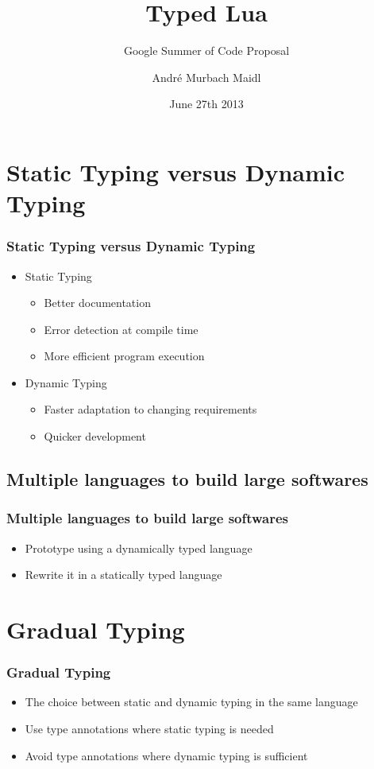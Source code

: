 \documentclass{beamer}
\begin{document}
\title{Typed Lua}
\subtitle{Google Summer of Code Proposal}
\author{André Murbach Maidl}
\date{June 27th 2013}

\frame{\titlepage}

\section{Static Typing versus Dynamic Typing}
\begin{frame}
\frametitle{Static Typing versus Dynamic Typing}
\begin{itemize}
\item Static Typing
\begin{itemize}
\item Better documentation
\item Error detection at compile time
\item More efficient program execution
\end{itemize}
\item Dynamic Typing
\begin{itemize}
\item Faster adaptation to changing requirements
\item Quicker development
\end{itemize}
\end{itemize}
\end{frame}

\subsection{Multiple languages to build large softwares}
\begin{frame}
\frametitle{Multiple languages to build large softwares}
\begin{itemize}
\item Prototype using a dynamically typed language
\item Rewrite it in a statically typed language
\end{itemize}
\end{frame}

\section{Gradual Typing}
\begin{frame}
\frametitle{Gradual Typing}
\begin{itemize}
\item The choice between static and dynamic typing in the same language
\item Use type annotations where static typing is needed
\item Avoid type annotations where dynamic typing is sufficient
\end{itemize}
\end{frame}
\end{document}
